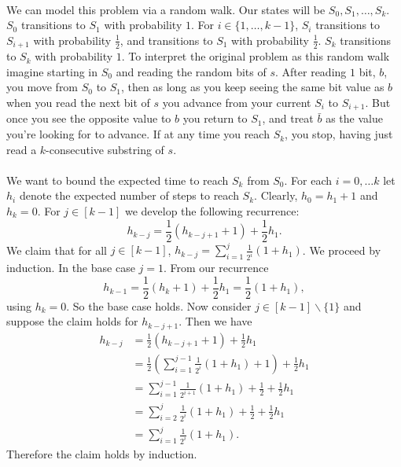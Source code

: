 \documentclass[letterpaper,12pt,oneside,onecolumn]{article}
\begin{document}
\paragraph{}
We can model this problem via a random walk. Our states will be $S_0, S_1, \dots, S_k$. $S_0$ transitions to $S_1$ with probability $1$. For $i \in \{1,\dots, k-1\}$, $S_i$ transitions to $S_{i+1}$ with probability $\frac{1}{2}$, and transitions to $S_1$ with probability $\frac{1}{2}$. $S_k$ transitions to $S_k$ with probability $1$. To interpret the original problem as this random walk imagine starting in $S_0$ and reading the random bits of $s$. After reading $1$ bit, $b$, you move from $S_0$ to $S_1$, then as long as you keep seeing the same bit value as $b$ when you read the next bit of $s$ you advance from your current $S_i$ to $S_{i+1}$. But once you see the opposite value to $b$ you return to $S_1$, and treat $\bar{b}$ as the value you're looking for to advance. If at any time you reach $S_k$, you stop, having just read a $k$-consecutive substring of $s$. 
\paragraph{}
We want to bound the expected time to reach $S_k$ from $S_0$. For each $i = 0, \dots k$ let $h_i$ denote the expected number of steps to reach $S_k$. Clearly, $h_0 = h_1 + 1$ and $h_k = 0$. For $j \in [k-1]$ we develop the following recurrence:
$$h_{k-j} = \frac{1}{2}(h_{k-j+1} + 1) + \frac{1}{2}h_1.$$
We claim that for all $j \in [k-1]$, $h_{k-j} = \sum_{i=1}^j \frac{1}{2^i}(1+h_1)$. We proceed by induction. In the base case $j=1$. From our recurrence
$$h_{k-1} = \frac{1}{2}(h_k+1) + \frac{1}{2}h_1 = \frac{1}{2}(1+h_1),$$
using $h_k = 0$. So the base case holds. Now consider $j \in [k-1]\backslash\{1\}$ and suppose the claim holds for $h_{k-j+1}$. Then we have
\begin{align*}
h_{k-j} &= \frac{1}{2}(h_{k-j+1} + 1) + \frac{1}{2}h_1\\
&= \frac{1}{2}( \sum_{i=1}^{j-1} \frac{1}{2^i}(1+h_1) + 1) + \frac{1}{2}h_1 \\
&=\sum_{i=1}^{j-1}\frac{1}{2^{i+1}}(1+h_1) + \frac{1}{2} + \frac{1}{2}h_1\\
&= \sum_{i=2}^{j}\frac{1}{2^{i}}(1+h_1) + \frac{1}{2} + \frac{1}{2}h_1 \\
&= \sum_{i=1}^j \frac{1}{2^i}(1+h_1).
\end{align*}
Therefore the claim holds by induction.
\end{document}
